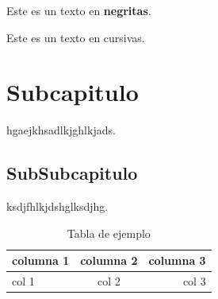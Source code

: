 Este es un texto en {\bf negritas}.
\\ \par

Este es un texto en {\sf cursivas}.

\section{Subcapitulo}

hgaejkhsadlkjghlkjads.

\subsection{SubSubcapitulo}

ksdjfhlkjdshglksdjhg.

\newpage


\begin{table}
\begin{center}

\begin{tabular}{| l | c | r ||}
\hline
\hline
columna 1 & columna 2 & columna 3 \\
\hline
col 1 & col 2 & col 3\\
\hline
\end{tabular}

\caption{Tabla de ejemplo}

\end{center}
\end{table}
